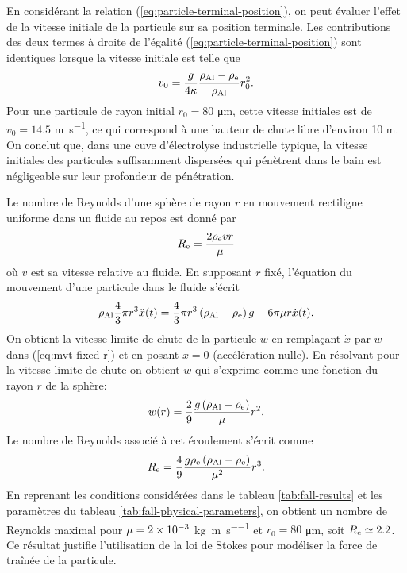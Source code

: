 \begin{remarque}
  En considérant la relation (\ref{eq:particle-terminal-position}), on
  peut évaluer l'effet de la vitesse initiale de la particule sur sa
  position terminale. Les contributions des deux termes à droite de
  l'égalité (\ref{eq:particle-terminal-position}) sont identiques
  lorsque la vitesse initiale est telle que
  \begin{equation*}
    v_0 = \frac{g}{4\kappa}\frac{\rho_\mathrm{Al} -
      \rho_\mathrm{e}}{\rho_\mathrm{Al}} r_0^2.
  \end{equation*}
  Pour une particule de rayon initial $r_0 = \num{80}$
  \si{\micro\meter}, cette vitesse initiales est de $v_0 = \num{14.5}$
  \si{\meter\per\second}, ce qui correspond à une hauteur de chute
  libre d'environ \num{10} \si{\meter}. On conclut que, dans une cuve
  d'électrolyse industrielle typique, la vitesse initiales des
  particules suffisamment dispersées qui pénètrent dans le bain est
  négligeable sur leur profondeur de pénétration.
\end{remarque}

\begin{remarque}
  Le nombre de Reynolds d'une sphère de rayon $r$ en mouvement
  rectiligne uniforme dans un fluide au repos est donné par
  \begin{equation*}
    R_{\mathrm e} = \frac{2 \rho_\mathrm{e} v r}{\mu}
  \end{equation*}
  où $v$ est sa vitesse relative au fluide.  En supposant $r$ fixé,
  l'équation du mouvement d'une particule dans le fluide s'écrit
  \begin{equation}\label{eq:mvt-fixed-r}
    \rho_\mathrm{Al} \frac{4}{3}\pi r^3 \ddot x(t) = \frac{4}{3}\pi
    r^3\left( \rho_\mathrm{Al} - \rho_\mathrm{e} \right)g -
  6\pi\mu r\dot x(t).
  \end{equation}
  On obtient la vitesse limite de chute de la particule $w$ en
  remplaçant $\dot x$ par $w$ dans (\ref{eq:mvt-fixed-r}) et en posant $\ddot x
  = 0$ (accélération nulle). En résolvant pour la vitesse limite de
  chute on obtient $w$ qui s'exprime comme une fonction du rayon $r$ de la sphère:
  \begin{equation}\label{eq:terminal-velocity}
    w(r) = \frac{2}{9}\frac{g\left( \rho_\mathrm{Al} - \rho_\mathrm{e} \right)}{\mu}r^2.
  \end{equation}
  Le nombre de Reynolds associé à cet écoulement s'écrit comme
  \begin{equation*}
    R_{\mathrm e} =
    \frac{4}{9}\frac{g\rho_\mathrm{e}\left( \rho_\mathrm{Al} - \rho_\mathrm{e} \right)}{\mu^2}r^3.
  \end{equation*}
  En reprenant les conditions considérées dans le tableau
  \ref{tab:fall-results} et les paramètres du tableau
  \ref{tab:fall-physical-parameters}, on obtient un nombre de Reynolds
  maximal pour $\mu = \num{2e-3}$
  \si{\kilo\gram\per\meter\per\second} et $r_0 = 80$
  \si{\micro\meter}, soit $R_{\mathrm e} \simeq 2.2$. Ce résultat justifie
  l'utilisation de la loi de Stokes pour modéliser la force de traînée
  de la particule.
\end{remarque}

